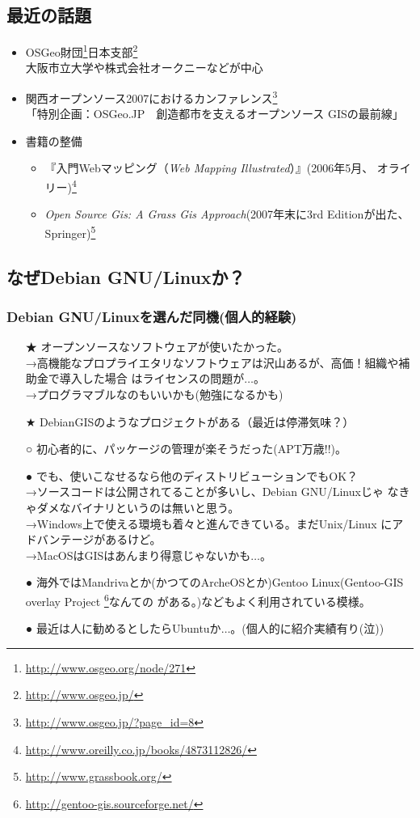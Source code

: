 \documentclass[mingoth,a4paper]{jsarticle}
\begin{document}
\subsection{最近の話題}
\begin{itemize}
 \item OSGeo財団\footnote{\url{http://www.osgeo.org/node/271}}日本支部\footnote{\url{http://www.osgeo.jp/}}\\
       大阪市立大学や株式会社オークニーなどが中心
 \item 関西オープンソース2007におけるカンファレンス\footnote{\url{http://www.osgeo.jp/?page_id=8}}\\
       「特別企画：OSGeo.JP　創造都市を支えるオープンソース GISの最前線」
 \item 書籍の整備
       \begin{itemize}
	\item 『入門Webマッピング（\textit{Web Mapping Illustrated}）』(2006年5月、
	      オライリー)\footnote{\url{http://www.oreilly.co.jp/books/4873112826/}}
	\item \textit{Open Source Gis: A Grass Gis Approach}(2007年末に3rd
	      Editionが出た、Springer)\footnote{\url{http://www.grassbook.org/}}
       \end{itemize}
\end{itemize}

\subsection{なぜDebian GNU/Linuxか？}
\subsubsection{Debian GNU/Linuxを選んだ同機(個人的経験)}
\begin{itemize}
 \item[★] オープンソースなソフトウェアが使いたかった。\\
       →高機能なプロプライエタリなソフトウェアは沢山あるが、高価！組織や補助金で導入した場合
	   はライセンスの問題が$\dots$。\\
	→プログラマブルなのもいいかも(勉強になるかも)
 \item[★] DebianGISのようなプロジェクトがある（最近は停滞気味？）
 \item[○] 初心者的に、パッケージの管理が楽そうだった(APT万歳!!)。
 \item[●] でも、使いこなせるなら他のディストリビューションでもOK？\\
	   →ソースコードは公開されてることが多いし、Debian GNU/Linuxじゃ
	   なきゃダメなバイナリというのは無いと思う。\\
	   →Windows上で使える環境も着々と進んできている。まだUnix/Linux
	   にアドバンテージがあるけど。\\
	   →MacOSはGISはあんまり得意じゃないかも$\dots$。
 \item[●] 海外ではMandrivaとか(かつてのArcheOSとか)Gentoo
	   Linux(Gentoo-GIS overlay Project \footnote{\url{http://gentoo-gis.sourceforge.net/}}なんての
	   がある。)などもよく利用されている模様。
 \item[●] 最近は人に勧めるとしたらUbuntuか$\dots$。(個人的に紹介実績有り(泣))
\end{itemize}
\end{document}
